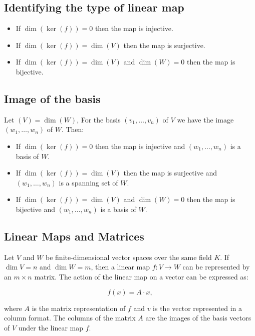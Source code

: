 \QED
  
\subsection{Identifying the type of linear map}

\begin{itemize} 
    \item If \(\dim(\ker(f)) = 0\) then the map is injective.
    \item If \(\dim(\ker(f)) = \dim(V)\) then the map is surjective.
    \item If \(\dim(\ker(f)) = \dim(V)\) and \(\dim(W) = 0\) then the map is bijective.
\end{itemize}

\subsection{Image of the basis}

Let \((V) = \dim(W)\), For the basis \((v_1, \dots, v_n)\) of \(V\) we have the image \((w_1, \dots, w_n)\) of \(W\). Then:

\begin{itemize}
    \item If \(\dim(\ker(f)) = 0\) then the map is injective and \((w_1, \dots, w_n)\) is a basis of \(W\).    
    \item If \(\dim(\ker(f)) = \dim(V)\) then the map is surjective and \((w_1, \dots, w_n)\) is a spanning set of \(W\).
    \item If \(\dim(\ker(f)) = \dim(V)\) and \(\dim(W) = 0\) then the map is bijective and \((w_1, \dots, w_n)\) is a 
    basis of \(W\).
\end{itemize}

\subsection{Linear Maps and Matrices}

Let \( V \) and \( W \) be finite-dimensional vector spaces over the same field \( K \). 
If \( \dim V = n \) and \( \dim W = m \), then a linear map \( f: V \to W \) can be represented by 
an \( m \times n \) matrix. The action of the linear map on a vector can be expressed as:

\[
    f(x) = A \cdot x,
\]

where \( A \) is the matrix representation of \( f \) and \( v \) is the vector represented in a column 
format. The columns of the matrix \( A \) are the images of the basis vectors of \( V \) under the linear 
map \( f \).

